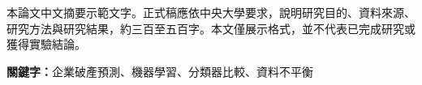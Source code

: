 本論文中文摘要示範文字。正式稿應依中央大學要求，說明研究目的、資料來源、研究方法與研究結果，約三百至五百字。本文僅展示格式，並不代表已完成研究或獲得實驗結論。

\noindent\textbf{關鍵字：}企業破產預測、機器學習、分類器比較、資料不平衡
